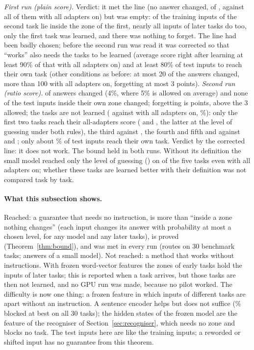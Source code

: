 \emph{First run (plain score).} Verdict: it met the line (no answer changed, \BoundBPlainChanged{} of \BoundBCompared{}, against all of them with all adapters on) but was empty: \BoundBPlainFirstTrainBlocked{} of the \BoundBTrain{} training inputs of the second task lie inside the zone of the first, nearly all inputs of later tasks do too, only the first task was learned, and there was nothing to forget. The line had been badly chosen; before the second run was read it was corrected so that ``works'' also needs the tasks to be learned (average score right after learning at least 90\% of that with all adapters on) and at least 80\% of test inputs to reach their own task (other conditions as before: at most 20 of the \BoundBCompared{} answers changed, more than 100 with all adapters on, forgetting at most 3 points).
\emph{Second run (ratio score).} \BoundBRatioChanged{} of \BoundBCompared{} answers changed (4\%, where 5\% is allowed on average) and none of the \BoundBRatioInside{} test inputs inside their own zone changed; forgetting is \BoundBRatioFT{} points, above the 3 allowed; the tasks are not learned (\BoundBRatioLearned{} against \BoundBAllLearned{} with all adapters on, \BoundBRatioRatioToAll{}\%): only the first two tasks reach their all-adapters score (\BoundBRatioScoreOne{} and \BoundBRatioScoreTwo{}, the latter at the level of guessing under both rules), the third \BoundBRatioScoreThree{} against \BoundBAllScoreThree{}, the fourth and fifth \BoundBRatioScoreFour{} and \BoundBRatioScoreFive{} against \BoundBAllScoreFour{} and \BoundBAllScoreFive{}; only about \BoundBRatioOwn{}\% of test inputs reach their own task. Verdict by the corrected line: it does not work. The bound held in both runs. Without its definition the small model reached only the level of guessing (\BoundBAllGuessScore{}) on \BoundBAllGuess{} of the five tasks even with all adapters on; whether these tasks are learned better with their definition was not compared task by task.

\paragraph{What this subsection shows.} Reached: a guarantee that needs no instruction, is more than ``inside a zone nothing changes'' (each input changes its answer with probability at most a chosen level, for any model and any later tasks), is proved (Theorem~\ref{thm:bound}), and was met in every run (routes on 30 benchmark tasks; answers of a small model). Not reached: a method that works without instructions. With frozen word-vector features the zones of early tasks hold the inputs of later tasks; this is reported when a task arrives, but those tasks are then not learned, and no GPU run was made, because no pilot worked. The difficulty is now one thing: a frozen feature in which inputs of different tasks are apart without an instruction. A sentence encoder helps but does not suffice (\BoundBothMiniRatioFiveBlocked{}\% blocked at best on all 30 tasks); the hidden states of the frozen model are the feature of the recogniser of Section~\ref{sec:recogniser}, which needs no zone and blocks no task. The test inputs here are like the training inputs; a reworded or shifted input has no guarantee from this theorem.

